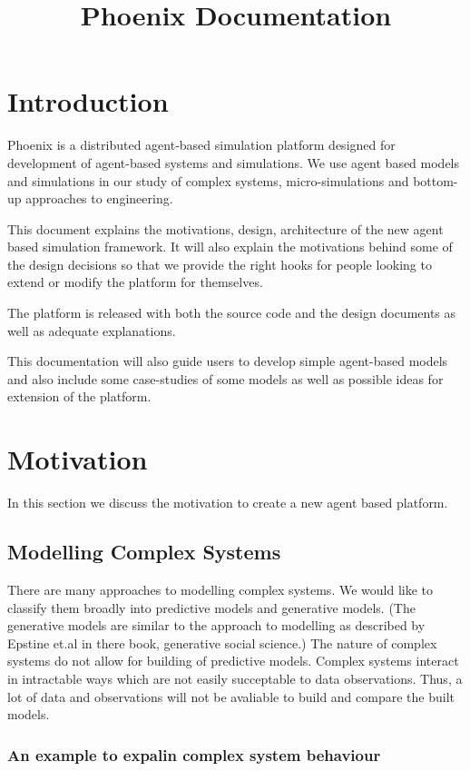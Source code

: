 \documentclass[a4paper,12pt]{report}
\begin{document}
\title{Phoenix Documentation}


 
\chapter{Introduction}
Phoenix is a distributed agent-based simulation platform designed for
development of agent-based systems and simulations. We use agent based
models and simulations in our study of complex systems,
micro-simulations and bottom-up approaches to engineering.

This document explains the motivations, design, architecture of the
new agent based simulation framework. It will also explain the
motivations behind some of the design decisions so that we provide the
right hooks for people looking to extend or modify the platform for
themselves. 

The platform is released with both the source code and the design
documents as well as adequate explanations.

This documentation will also guide users to develop simple agent-based
models and also include some case-studies of some models as well as
possible ideas for extension of the platform.

\chapter{Motivation}
In this section we discuss the motivation to create a new agent based
 platform.
\section{Modelling Complex Systems}
There are many approaches to modelling complex systems. We would like
to classify them broadly into predictive models and generative
models. (The generative models are similar to the approach to
modelling as described by Epstine et.al in there book, generative
social science.) The nature of complex systems do not allow for
building of predictive models. Complex systems interact in intractable
ways which are not easily succeptable to data observations. Thus, a
lot of data and observations will not be avaliable to build and
compare the built models.

\subsection{An example to expalin complex system behaviour}
\end{document}
